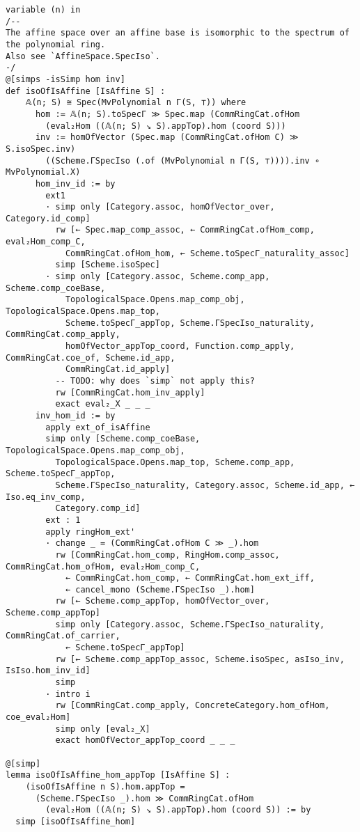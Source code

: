 \documentclass{article}
\begin{document}
\begin{lstlisting}[language=Lean, caption={AffineSpace.lean}]
variable (n) in
/--
The affine space over an affine base is isomorphic to the spectrum of the polynomial ring.
Also see `AffineSpace.SpecIso`.
-/
@[simps -isSimp hom inv]
def isoOfIsAffine [IsAffine S] :
    𝔸(n; S) ≅ Spec(MvPolynomial n Γ(S, ⊤)) where
      hom := 𝔸(n; S).toSpecΓ ≫ Spec.map (CommRingCat.ofHom
        (eval₂Hom ((𝔸(n; S) ↘ S).appTop).hom (coord S)))
      inv := homOfVector (Spec.map (CommRingCat.ofHom C) ≫ S.isoSpec.inv)
        ((Scheme.ΓSpecIso (.of (MvPolynomial n Γ(S, ⊤)))).inv ∘ MvPolynomial.X)
      hom_inv_id := by
        ext1
        · simp only [Category.assoc, homOfVector_over, Category.id_comp]
          rw [← Spec.map_comp_assoc, ← CommRingCat.ofHom_comp, eval₂Hom_comp_C,
            CommRingCat.ofHom_hom, ← Scheme.toSpecΓ_naturality_assoc]
          simp [Scheme.isoSpec]
        · simp only [Category.assoc, Scheme.comp_app, Scheme.comp_coeBase,
            TopologicalSpace.Opens.map_comp_obj, TopologicalSpace.Opens.map_top,
            Scheme.toSpecΓ_appTop, Scheme.ΓSpecIso_naturality, CommRingCat.comp_apply,
            homOfVector_appTop_coord, Function.comp_apply, CommRingCat.coe_of, Scheme.id_app,
            CommRingCat.id_apply]
          -- TODO: why does `simp` not apply this?
          rw [CommRingCat.hom_inv_apply]
          exact eval₂_X _ _ _
      inv_hom_id := by
        apply ext_of_isAffine
        simp only [Scheme.comp_coeBase, TopologicalSpace.Opens.map_comp_obj,
          TopologicalSpace.Opens.map_top, Scheme.comp_app, Scheme.toSpecΓ_appTop,
          Scheme.ΓSpecIso_naturality, Category.assoc, Scheme.id_app, ← Iso.eq_inv_comp,
          Category.comp_id]
        ext : 1
        apply ringHom_ext'
        · change _ = (CommRingCat.ofHom C ≫ _).hom
          rw [CommRingCat.hom_comp, RingHom.comp_assoc, CommRingCat.hom_ofHom, eval₂Hom_comp_C,
            ← CommRingCat.hom_comp, ← CommRingCat.hom_ext_iff,
            ← cancel_mono (Scheme.ΓSpecIso _).hom]
          rw [← Scheme.comp_appTop, homOfVector_over, Scheme.comp_appTop]
          simp only [Category.assoc, Scheme.ΓSpecIso_naturality, CommRingCat.of_carrier,
            ← Scheme.toSpecΓ_appTop]
          rw [← Scheme.comp_appTop_assoc, Scheme.isoSpec, asIso_inv, IsIso.hom_inv_id]
          simp
        · intro i
          rw [CommRingCat.comp_apply, ConcreteCategory.hom_ofHom, coe_eval₂Hom]
          simp only [eval₂_X]
          exact homOfVector_appTop_coord _ _ _

@[simp]
lemma isoOfIsAffine_hom_appTop [IsAffine S] :
    (isoOfIsAffine n S).hom.appTop =
      (Scheme.ΓSpecIso _).hom ≫ CommRingCat.ofHom
        (eval₂Hom ((𝔸(n; S) ↘ S).appTop).hom (coord S)) := by
  simp [isoOfIsAffine_hom]


\end{lstlisting}
\end{document}
